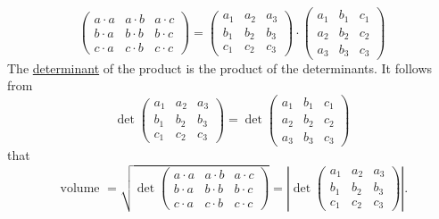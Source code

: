 \documentclass[color=black,11pt]{elegantpaper}
\begin{document}
$$
\left( \begin{array}{ccc}
             a\cdot a& a\cdot b & a \cdot c\\
             b\cdot a& b\cdot b & b \cdot c\\
             c\cdot a& c\cdot b & c \cdot c
           \end{array} \right)= \left( \begin{array}{ccc}
                                        a_1 & a_2 & a_3\\ 
                                        b_1 & b_2 & b_3\\ 
                                        c_1 & c_2 & c_3 
                                        \end{array} \right)\cdot \left( \begin{array}{ccc}
                                                                         a_1 & b_1 & c_1\\
                                                                         a_2 & b_2 & c_2\\
                                                                         a_3 & b_3 & c_3
                                                                         \end{array} \right)
$$
The \href{https://en.wikipedia.org/wiki/Determinant}{determinant} of the product is the product of  the determinants. It follows from
$$
\det \left( \begin{array}{ccc}
                                        a_1 & a_2 & a_3\\
                                        b_1 & b_2 & b_3\\
                                        c_1 & c_2 & c_3
                                        \end{array} \right)= \det \left( \begin{array}{ccc}
                                                                         a_1 & b_1 & c_1\\
                                                                         a_2 & b_2 & c_2\\
                                                                         a_3 & b_3 & c_3  
                                                                         \end{array} \right)
$$
that
$$
\mbox{ volume } = \sqrt{\det \left( \begin{array}{ccc}
             a\cdot a& a\cdot b & a \cdot c\\
             b\cdot a& b\cdot b & b \cdot c\\
             c\cdot a& c\cdot b & c \cdot c
           \end{array} \right)  } = |\det \left( \begin{array}{ccc}
                                        a_1 & a_2 & a_3\\
                                        b_1 & b_2 & b_3\\
                                        c_1 & c_2 & c_3
                                        \end{array} \right) |.
$$
\end{document}
